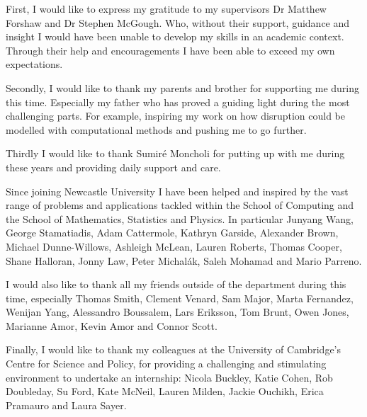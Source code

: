 
\begin{acknowledgements}      


First, I would like to express my gratitude to my supervisors Dr Matthew Forshaw and Dr Stephen McGough. Who, without their support, guidance and insight I would have been unable to develop my skills in an academic context. Through their help and encouragements I have been able to exceed my own expectations.

Secondly, I would like to thank my parents and brother for supporting me during this time. Especially my father who has proved a guiding light during the most challenging parts. For example, inspiring my work on how disruption could be modelled with computational methods and pushing me to go further.

Thirdly I would like to thank Sumiré Moncholi for putting up with me during these years and providing daily support and care.

Since joining Newcastle University I have been helped and inspired by the vast range of problems and applications tackled within the School of Computing and the School of Mathematics, Statistics and Physics. In particular Junyang Wang, George Stamatiadis, Adam Cattermole, Kathryn Garside, Alexander Brown, Michael Dunne-Willows, Ashleigh McLean, Lauren Roberts, Thomas Cooper, Shane Halloran, Jonny Law, Peter Michalák, Saleh Mohamad and Mario Parreno.

I would also like to thank all my friends outside of the department during this time, especially Thomas Smith, Clement Venard, Sam Major, Marta Fernandez, Wenijan Yang, Alessandro Boussalem, Lars Eriksson, Tom Brunt, Owen Jones, Marianne Amor, Kevin Amor and Connor Scott.

Finally, I would like to thank my colleagues at the University of Cambridge's Centre for Science and Policy, for providing a challenging and stimulating environment to undertake an internship: Nicola Buckley, Katie Cohen, Rob Doubleday, Su Ford, Kate McNeil, Lauren Milden, Jackie Ouchikh, Erica Pramauro and Laura Sayer.

\end{acknowledgements}
